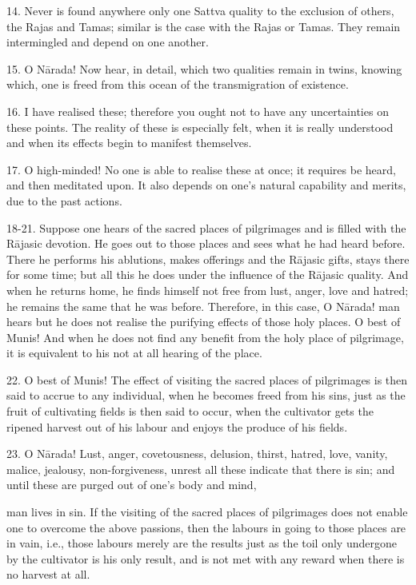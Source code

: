 14. Never is found anywhere only one Sattva quality to the exclusion of others, the Rajas and Tamas; similar is the case with the Rajas or Tamas. They remain intermingled and depend on one another.

15. O N\=arada! Now hear, in detail, which two qualities remain in twins, knowing which, one is freed from this ocean of the transmigration of existence.

16. I have realised these; therefore you ought not to have any uncertainties on these points. The reality of these is especially felt, when it is really understood and when its effects begin to manifest themselves.

17. O high-minded! No one is able to realise these at once; it requires be heard, and then meditated upon. It also depends on one's natural capability and merits, due to the past actions.

18-21. Suppose one hears of the sacred places of pilgrimages and is filled with the R\=ajasic devotion. He goes out to those places and sees what he had heard before. There he performs his ablutions, makes offerings and the R\=ajasic gifts, stays there for some time; but all this he does under the influence of the R\=ajasic quality. And when he returns home, he finds himself not free from lust, anger, love and hatred; he remains the same that he was before. Therefore, in this case, O N\=arada! man hears but he does not realise the purifying effects of those holy places. O best of Munis! And when he does not find any benefit from the holy place of pilgrimage, it is equivalent to his not at all hearing of the place.

22. O best of Munis! The effect of visiting the sacred places of pilgrimages is then said to accrue to any individual, when he becomes freed from his sins, just as the fruit of cultivating fields is then said to occur, when the cultivator gets the ripened harvest out of his labour and enjoys the produce of his fields.

23. O N\=arada! Lust, anger, covetousness, delusion, thirst, hatred, love, vanity, malice, jealousy, non-forgiveness, unrest all these indicate that there is sin; and until these are purged out of one's body and mind,

man lives in sin. If the visiting of the sacred places of pilgrimages does not enable one to overcome the above passions, then the labours in going to those places are in vain, i.e., those labours merely are the results just as the toil only undergone by the cultivator is his only result, and is not met with any reward when there is no harvest at all.

